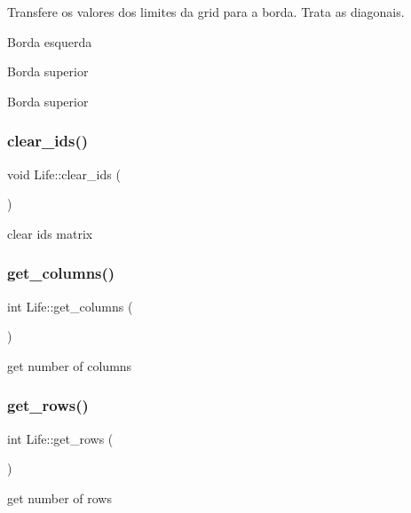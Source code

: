 Transfere os valores dos limites da grid para a borda. Trata as diagonais.

Borda esquerda

Borda superior

Borda superior \mbox{\label{classLife_ac79ef6f9e91fd76fc9d1906cfc2b34ee}} 
\subsubsection{\texorpdfstring{clear\+\_\+ids()}{clear\_ids()}}
{\footnotesize\ttfamily void Life\+::clear\+\_\+ids (\begin{DoxyParamCaption}{ }\end{DoxyParamCaption})}



clear ids matrix 

\mbox{\label{classLife_ac82f1ba83db36b3142ec12c2fc334de3}} 
\subsubsection{\texorpdfstring{get\+\_\+columns()}{get\_columns()}}
{\footnotesize\ttfamily int Life\+::get\+\_\+columns (\begin{DoxyParamCaption}{ }\end{DoxyParamCaption})}



get number of columns 

\mbox{\label{classLife_ae4a3608385b8435f55102c89363d6e26}} 
\subsubsection{\texorpdfstring{get\+\_\+rows()}{get\_rows()}}
{\footnotesize\ttfamily int Life\+::get\+\_\+rows (\begin{DoxyParamCaption}{ }\end{DoxyParamCaption})}



get number of rows 

\mbox{\label{classLife_a3beeb3680b687283d2db135650e690bf}} 
